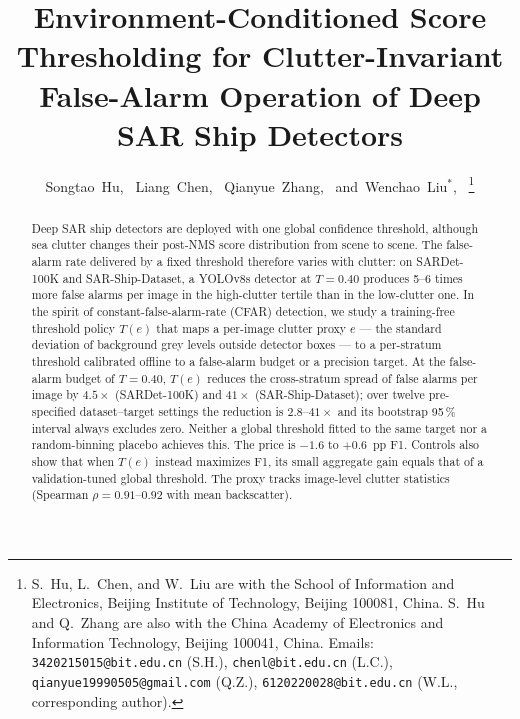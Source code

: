 \documentclass[journal]{IEEEtran}
\providecommand{\linelabel}[1]{}
\begin{document}
\title{Environment-Conditioned Score Thresholding for Clutter-Invariant False-Alarm Operation of Deep SAR Ship Detectors}

\author{Songtao~Hu,~\IEEEmembership{}
        Liang~Chen,~\IEEEmembership{}
        Qianyue~Zhang,~\IEEEmembership{}
        and~Wenchao~Liu$^{*}$,~\IEEEmembership{}
\thanks{S.~Hu, L.~Chen, and W.~Liu are with the School of Information
and Electronics, Beijing Institute of Technology, Beijing 100081, China.
S.~Hu and Q.~Zhang are also with the China Academy of Electronics and
Information Technology, Beijing 100041, China.
Emails: \texttt{3420215015@bit.edu.cn} (S.H.),
\texttt{chenl@bit.edu.cn} (L.C.),
\texttt{qianyue19990505@gmail.com} (Q.Z.),
\texttt{6120220028@bit.edu.cn} (W.L., corresponding author).}}

\maketitle

\begin{abstract}
\linelabel{ln:abs}Deep SAR ship detectors are deployed with one global confidence
threshold, although sea clutter changes their post-NMS score distribution
from scene to scene. The false-alarm rate delivered by a fixed threshold
therefore varies with clutter: on SARDet-100K and SAR-Ship-Dataset, a
YOLOv8s detector at $T{=}0.40$ produces 5--6 times more false alarms per
image in the high-clutter tertile than in the low-clutter one. In the
spirit of constant-false-alarm-rate (CFAR) detection, we study a
training-free threshold policy $T(e)$ that maps a per-image clutter
proxy $e$ --- the standard deviation of background grey levels outside
detector boxes --- to a per-stratum threshold calibrated offline to a
false-alarm budget or a precision target. At the false-alarm budget of
$T{=}0.40$, $T(e)$ reduces the cross-stratum spread of false alarms per
image by $4.5\times$ (SARDet-100K) and $41\times$ (SAR-Ship-Dataset); over
twelve pre-specified dataset--target settings the reduction is
$2.8$--$41\times$ and its bootstrap 95\,\% interval always excludes zero.
Neither a global threshold fitted to the same target nor a random-binning
placebo achieves this. The price is $-1.6$ to $+0.6$~pp F1. Controls also
show that when $T(e)$ instead maximizes F1, its small aggregate gain
equals that of a validation-tuned global threshold. The proxy tracks
image-level clutter statistics (Spearman $\rho{=}0.91$--$0.92$ with mean
backscatter).\linelabel{ln:absend}
\end{abstract}
\end{document}
